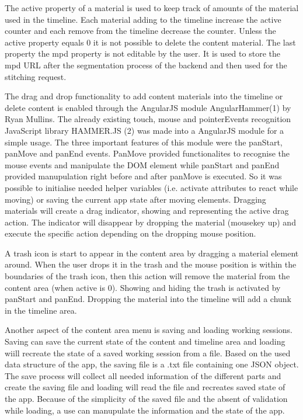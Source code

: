 \documentclass[conference]{IEEEtran}
\begin{document}
The active property of a material is used to keep track of amounts of the material used in the timeline. Each material adding to the timeline increase the active counter and each remove from the timeline decrease the counter. Unless the active property equals 0 it is not possible to delete the content material. The last property the mpd property is not editable by the user. It is used to store the mpd URL after the segmentation process of the backend and then used for the stitching request.

The drag and drop functionality to add content materials into the timeline or delete content is enabled through the AngularJS module AngularHammer(1) by Ryan Mullins. The already existing touch, mouse and pointerEvents recognition JavaScript library HAMMER.JS (2) was made into a AngularJS module for a simple usage. The three important features of this module were the panStart, panMove and panEnd events. PanMove provided functionalites to recognise the mouse events and manipulate the DOM element while panStart and panEnd provided manupulation right before and after panMove is executed. So it was possible to initialise needed helper variables (i.e. activate attributes to react while moving) or saving the current app state after moving elements. Dragging materials will create a drag indicator, showing and representing the active drag action. The indicator will disappear by dropping the material (mousekey up) and execute the specific action depending on the dropping mouse position.

A trash icon is start to appear in the content area by dragging a material element around. When the user drops it in the trash and the mouse position is within the boundaries of the trash icon, then this action will remove the material from the content area (when active is 0). Showing and hiding the trash is activated by panStart and panEnd. Dropping the material into the timeline will add a chunk in the timeline area.

Another aspect of the content area menu is saving and loading working sessions. Saving can save the current state of the content and timeline area and loading wiill recreate the state of a saved working session from a file. Based on the used data structure of the app, the saving file is a .txt file containing one JSON object. The save process will collect all needed information of the different parts and create the saving file and loading will read the file and recreates saved state of the app. Because of the simplicity of the saved file and the absent of validation while loading, a use can manupulate the information and the state of the app.
\end{document}
